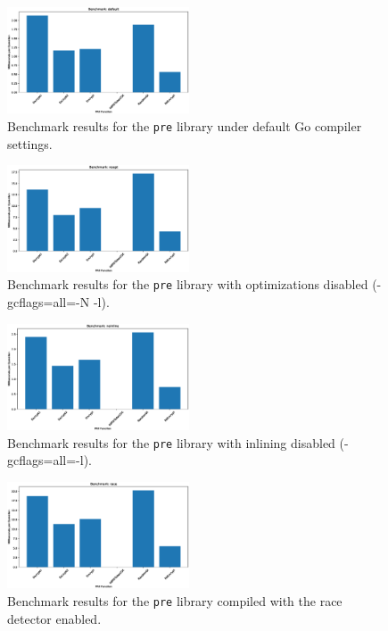 \begin{figure}
    \centering
    \includegraphics[width=0.48\textwidth]{figs/bench_default}
    \caption{Benchmark results for the \texttt{pre} library under default Go compiler settings.}
    \label{fig:bench-default}
\end{figure}

\begin{figure}
    \centering
    \includegraphics[width=0.48\textwidth]{figs/bench_noopt}
    \caption{Benchmark results for the \texttt{pre} library with optimizations disabled (-gcflags=all=-N -l).}
    \label{fig:bench-noopt}
\end{figure}

\begin{figure}
    \centering
    \includegraphics[width=0.48\textwidth]{figs/bench_noinline}
    \caption{Benchmark results for the \texttt{pre} library with inlining disabled (-gcflags=all=-l).}
    \label{fig:bench-noinline}
\end{figure}

\begin{figure}
    \centering
    \includegraphics[width=0.48\textwidth]{figs/bench_race}
    \caption{Benchmark results for the \texttt{pre} library compiled with the race detector enabled.}
    \label{fig:bench-race}
\end{figure}

